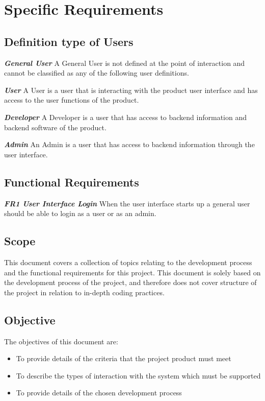 \chapter{Specific Requirements}

\section{Definition type of Users}
\textbf{\textit{General User}}\newline
A General User is not defined at the point of interaction and cannot be classified as any of the following user 
definitions.\newline

\textbf{\textit{User}}\newline
A User is a user that is interacting with the product user interface and has access to the user functions of the 
product.\newline

\textbf{\textit{Developer}}\newline
A Developer is a user that has access to backend information and backend software of the product.\newline

\textbf{\textit{Admin}}\newline
An Admin is a user that has access to backend information through the user interface.

\section{Functional Requirements}
\textbf{\textit{FR1 User Interface Login}}\newline
When the user interface starts up a general user should be able to login as a user or as an admin.

\section{Scope}
This document covers a collection of topics relating to the development process and the functional requirements for 
this project. This document is solely based on the development process of the project, and therefore does not cover 
structure of the project in relation to in-depth coding practices. 

\section{Objective}
The objectives of this document are:

\begin{itemize}
   \item To provide details of the criteria that the project product must meet
   \item To describe the types of interaction with the system which must be supported
   \item To provide details of the chosen development process
\end{itemize}

